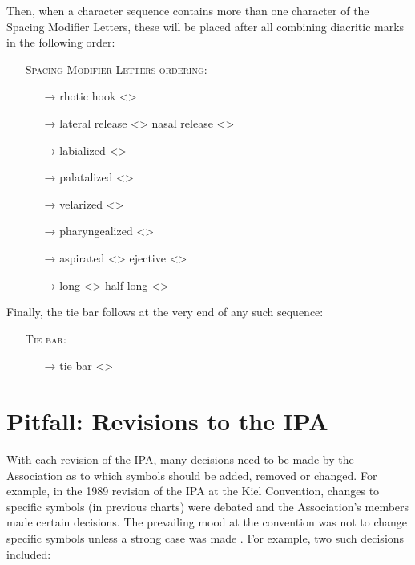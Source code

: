 \noindent Then, when a character sequence contains more than one character of the Spacing
Modifier Letters, these will be placed after all combining diacritic marks in the
following order:

\begin{itemize}
	\item[] \textsc{Spacing Modifier Letters ordering:}
	\begin{itemize}
	  \item[→] rhotic hook <>
	  \item[→] lateral release <> \textbar{} nasal release <>
	  \item[→] labialized <>
	  \item[→] palatalized <>
	  \item[→] velarized <>
	  \item[→] pharyngealized <>
	  \item[→] aspirated <> \textbar{} ejective <>
	  \item[→] long <> \textbar{} half-long <>
	\end{itemize}
\end{itemize}

\noindent Finally, the tie bar follows at the very end of any such sequence:

\begin{itemize}
  \item[] \textsc{Tie bar:}
  \begin{itemize}
    \item[→] tie bar <>
  \end{itemize}
\end{itemize}

\section{Pitfall: Revisions to the IPA}
\label{ipa-revisions}

With each revision of the IPA, many decisions need to be made by 
the Association as to which symbols should be added, removed or 
changed. For example, in the 1989 revision of the IPA at the Kiel Convention, 
changes to specific symbols (in previous charts) were debated and 
the Association's members made certain decisions. The prevailing mood at 
the convention was not to change specific symbols unless a strong 
case was made \citep{Ladefoged1990a}. For example, two such decisions 
included:

